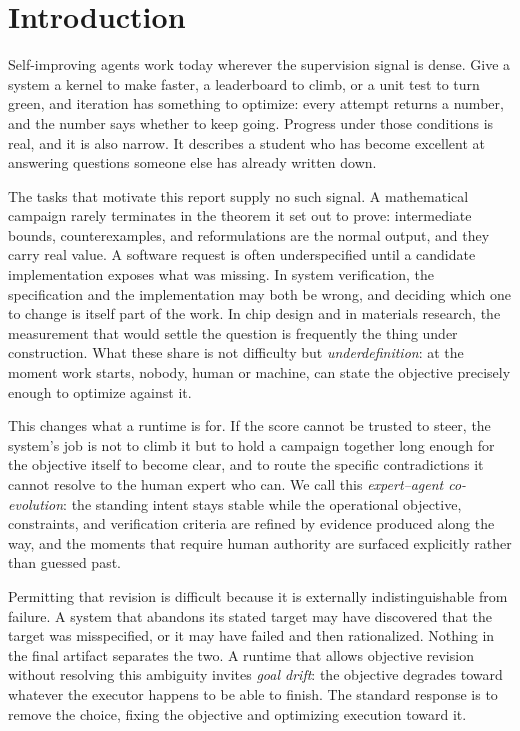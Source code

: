 \section{Introduction}
\label{sec:introduction}

Self-improving agents work today wherever the supervision signal is dense. Give a
system a kernel to make faster, a leaderboard to climb, or a unit test to turn green,
and iteration has something to optimize: every attempt returns a number, and the
number says whether to keep going. Progress under those conditions is real, and it is
also narrow. It describes a student who has become excellent at answering questions
someone else has already written down.

The tasks that motivate this report supply no such signal. A mathematical campaign
rarely terminates in the theorem it set out to prove: intermediate bounds,
counterexamples, and reformulations are the normal output, and they carry real value.
A software request is often underspecified until a candidate implementation exposes
what was missing. In system verification, the specification and the implementation may
both be wrong, and deciding which one to change is itself part of the work. In chip
design and in materials research, the measurement that would settle the question is
frequently the thing under construction. What these share is not difficulty but
\emph{underdefinition}: at the moment work starts, nobody, human or machine, can state
the objective precisely enough to optimize against it.

This changes what a runtime is for. If the score cannot be trusted to steer, the
system's job is not to climb it but to hold a campaign together long enough for the
objective itself to become clear, and to route the specific contradictions it cannot
resolve to the human expert who can. We call this \emph{expert--agent co-evolution}:
the standing intent stays stable while the operational objective, constraints, and
verification criteria are refined by evidence produced along the way, and the moments
that require human authority are surfaced explicitly rather than guessed past.

Permitting that revision is difficult because it is externally indistinguishable from
failure. A system that abandons its stated target may have discovered that the target
was misspecified, or it may have failed and then rationalized. Nothing in the final
artifact separates the two. A runtime that allows objective revision without resolving
this ambiguity invites \emph{goal drift}: the objective degrades toward whatever the
executor happens to be able to finish. The standard response is to remove the choice,
fixing the objective and optimizing execution toward it.

